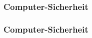 \begin{frame}
\frametitle{Computer-Sicherheit}
\begin{itemize}
  
\end{itemize}
\end{frame}

\begin{frame}
\frametitle{Computer-Sicherheit}
\begin{itemize}
  
\end{itemize}
\end{frame}